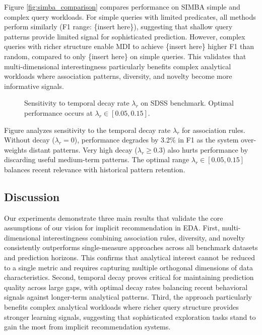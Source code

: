 \documentclass[sigconf, nonacm]{acmart}
\begin{document}
Figure \ref{fig:simba_comparison} compares performance on SIMBA simple and complex query workloads. For simple queries with limited predicates, all methods perform similarly (F1 range: \{insert here\}), suggesting that shallow query patterns provide limited signal for sophisticated prediction. However, complex queries with richer structure enable MDI to achieve \{insert here\} higher F1 than random, compared to only \{insert here\} on simple queries. This validates that multi-dimensional interestingness particularly benefits complex analytical workloads where association patterns, diversity, and novelty become more informative signals.


\begin{figure}[t]
\centering
\caption{Sensitivity to temporal decay rate $\lambda_r$ on SDSS benchmark. Optimal performance occurs at $\lambda_r \in [0.05, 0.15]$.}
\label{fig:decay_sensitivity}
\end{figure}

Figure  analyzes sensitivity to the temporal decay rate $\lambda_r$ for association rules. Without decay ($\lambda_r=0$), performance degrades by 3.2\% in F1 as the system over-weights distant patterns. Very high decay ($\lambda_r \geq 0.3$) also hurts performance by discarding useful medium-term patterns. The optimal range $\lambda_r \in [0.05, 0.15]$ balances recent relevance with historical pattern retention.

\subsection{Discussion}

Our experiments demonstrate three main results that validate the core assumptions of our vision for implicit recommendation in EDA. First, multi-dimensional interestingness combining association rules, diversity, and novelty consistently outperforms single-measure approaches across all benchmark datasets and prediction horizons. This confirms that analytical interest cannot be reduced to a single metric and requires capturing multiple orthogonal dimensions of data characteristics. Second, temporal decay proves critical for maintaining prediction quality across large gaps, with optimal decay rates balancing recent behavioral signals against longer-term analytical patterns. Third, the approach particularly benefits complex analytical workloads where richer query structure provides stronger learning signals, suggesting that sophisticated exploration tasks stand to gain the most from implicit recommendation systems.
\end{document}
